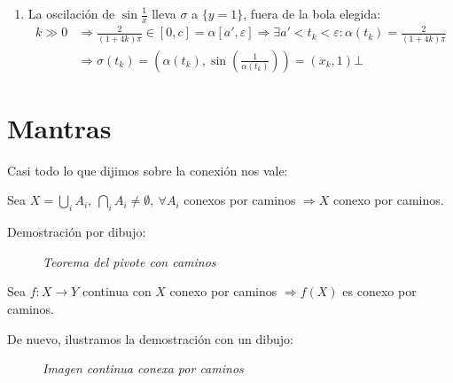 \begin{ej}
\begin{enumerate}
\begin{demo}
\begin{enumerate}
            \item La oscilación de $\sin \frac{1}{x}$ lleva $\sigma$ a $\{y = 1\}$, fuera de la bola elegida:
            \begin{align*}
            k \gg 0 &\Rightarrow \frac{2}{\left( 1 + 4k \right) \pi} \in \left[ 0, c \right] = \alpha\left[ a', \varepsilon \right] \Rightarrow \exists a' < t_k < \varepsilon: \alpha\left( t_k \right) = \frac{2}{\left( 1 + 4k \right) \pi}\\ 
                &\Rightarrow \sigma\left( t_k \right) = \left( \alpha\left( t_k \right), \sin\left( \frac{1}{\alpha\left( t_k \right)} \right) \right) = \left( x_k, 1 \right) 
            \bot \end{align*}
        \end{enumerate}
    \end{demo}
\end{enumerate}
\end{ej}

\section{Mantras}%
\label{sec:mantras_conx_caminos}
Casi todo lo que dijimos sobre la conexión nos vale:
\begin{prop}
Sea $X = \bigcup_{i} A_i,\ \bigcap_{i} A_i \neq \emptyset,\ \forall A_i$ conexos por caminos $\Rightarrow X$ conexo por caminos. 
\end{prop}
\begin{demo}
Demostración por dibujo:
\begin{figure}[H]
    \centering
    \caption{\textit{Teorema del pivote con caminos}}
    \label{fig:teorema-del-pivote-caminos}
\end{figure}
\end{demo}

\begin{prop}
Sea $f: X \rightarrow Y$ continua con $X$ conexo por caminos $\Rightarrow f\left( X \right)$ es conexo por caminos. 
\end{prop}
\begin{demo}
De nuevo, ilustramos la demostración con un dibujo:
\begin{figure}[H]
    \centering
    \caption{\textit{Imagen continua conexa por caminos}}
    \label{fig:imagen-conexa-por-caminos}
\end{figure}
\end{demo}

